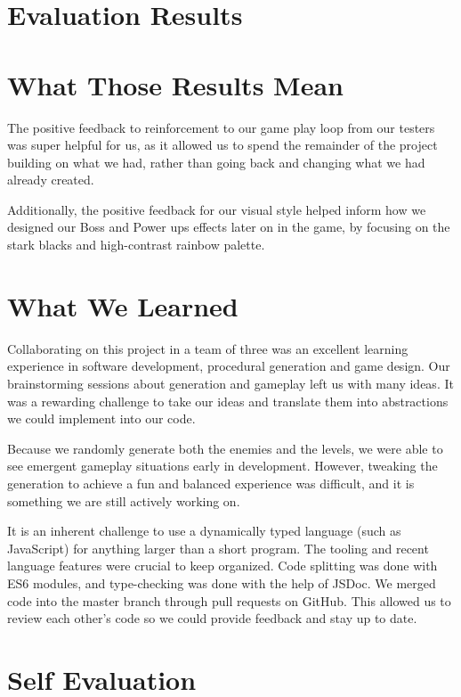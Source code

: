 \documentclass[a4paper, 12pt]{article}
\begin{document}
\section{Evaluation Results}



\section{What Those Results Mean}

The positive feedback to reinforcement to our game play loop from our testers was
super helpful for us, as it allowed us to spend the remainder of the project
building on what we had, rather than going back and changing what we had already
created.

Additionally, the positive feedback for our visual style helped inform how we
designed our Boss and Power ups effects later on in the game, by focusing on the
stark blacks and high-contrast rainbow palette.

\section{What We Learned}

Collaborating on this project in a team of three was an excellent learning
experience in software development, procedural generation and game design. Our
brainstorming sessions about generation and gameplay left us with many ideas. It
was a rewarding challenge to take our ideas and translate them into abstractions
we could implement into our code.

Because we randomly generate both the enemies and the levels, we were able to
see emergent gameplay situations early in development. However, tweaking the
generation to achieve a fun and balanced experience was difficult, and it is
something we are still actively working on.

It is an inherent challenge to use a dynamically typed language (such as
JavaScript) for anything larger than a short program. The tooling and recent
language features were crucial to keep organized. Code splitting was done with
ES6 modules, and type-checking was done with the help of JSDoc. We merged code
into the master branch through pull requests on GitHub. This allowed us to
review each other's code so we could provide feedback and stay up to date.

\section{Self Evaluation}
\end{document}
